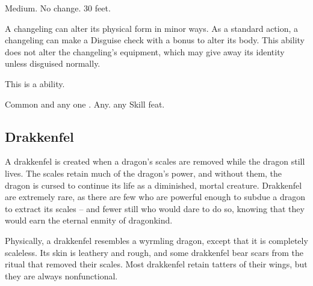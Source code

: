          Medium.
         No change.
         30 feet.
        \begin{itemize}
             A changeling can alter its physical form in minor ways. As a standard action, a changeling can make a Disguise check with a  bonus to alter its body. This ability does not alter the changeling's equipment, which may give away its identity unless disguised normally.

            This is a  ability.
        \end{itemize}
         Common and any one .
         Any.
         any Skill feat.

    \subsection{Drakkenfel}

        A drakkenfel is created when a dragon's scales are removed while the dragon still lives. The scales retain much of the dragon's power, and without them, the dragon is cursed to continue its life as a diminished, mortal creature.
        Drakkenfel are extremely rare, as there are few who are powerful enough to subdue a dragon to extract its scales -- and fewer still who would dare to do so, knowing that they would earn the eternal enmity of dragonkind.

        Physically, a drakkenfel resembles a wyrmling dragon, except that it is completely scaleless.
        Its skin is leathery and rough, and some drakkenfel bear scars from the ritual that removed their scales.
        Most drakkenfel retain tatters of their wings, but they are always nonfunctional.

